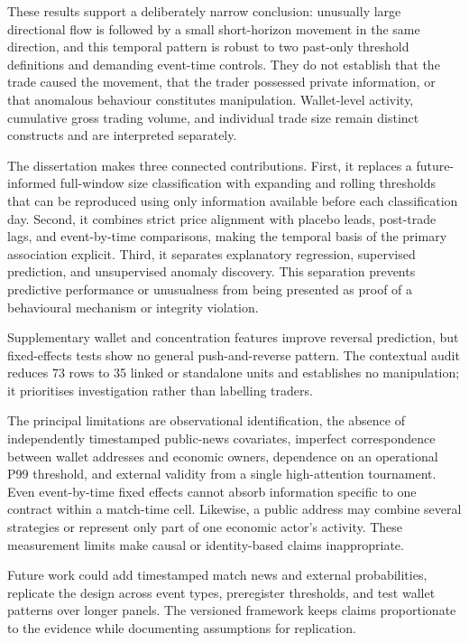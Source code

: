 These results support a deliberately narrow conclusion: unusually large directional flow is followed by a small short-horizon movement in the same direction, and this temporal pattern is robust to two past-only threshold definitions and demanding event-time controls. They do not establish that the trade caused the movement, that the trader possessed private information, or that anomalous behaviour constitutes manipulation. Wallet-level activity, cumulative gross trading volume, and individual trade size remain distinct constructs and are interpreted separately.

The dissertation makes three connected contributions. First, it replaces a
future-informed full-window size classification with expanding and rolling
thresholds that can be reproduced using only information available before each
classification day. Second, it combines strict price alignment with placebo
leads, post-trade lags, and event-by-time comparisons, making the temporal basis
of the primary association explicit. Third, it separates explanatory
regression, supervised prediction, and unsupervised anomaly discovery. This
separation prevents predictive performance or unusualness from being presented
as proof of a behavioural mechanism or integrity violation.

Supplementary wallet and concentration features improve reversal prediction,
but fixed-effects tests show no general push-and-reverse pattern. The contextual
audit reduces 73 rows to 35 linked or standalone units and establishes no
manipulation; it prioritises investigation rather than labelling traders.

The principal limitations are observational identification, the absence of independently timestamped public-news covariates, imperfect correspondence between wallet addresses and economic owners, dependence on an operational P99 threshold, and external validity from a single high-attention tournament. Even event-by-time fixed effects cannot absorb information specific to one contract within a match-time cell. Likewise, a public address may combine several strategies or represent only part of one economic actor's activity. These measurement limits make causal or identity-based claims inappropriate.

Future work could add timestamped match news and external probabilities,
replicate the design across event types, preregister thresholds, and test wallet
patterns over longer panels. The versioned framework keeps claims proportionate
to the evidence while documenting assumptions for replication.
